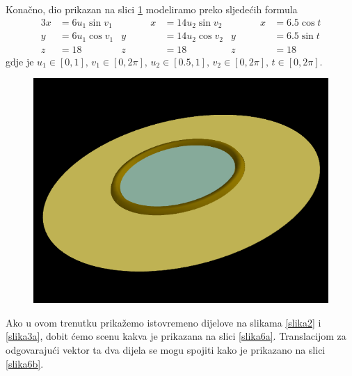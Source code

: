 \documentclass[a4paper,12pt]{article}
\theoremstyle{zad}
\begin{document}
\noindent Kona\v{c}no, dio prikazan na slici \ref{slika5} modeliramo preko sljede\'cih formula
\begin{alignat*}{3}
x&=6u_1\sin{v_1}&\qquad\quad x&=14u_2\sin{v_2}&\qquad\quad x&=6.5\cos{t}\\[3pt]
y&=6u_1\cos{v_1}& y&=14u_2\cos{v_2}& y&=6.5\sin{t}\\[3pt]
z&=18& z&=18& z&=18
\end{alignat*}
gdje je $u_1\in[0,1],\, v_1\in[0,2\pi],\, u_2\in[0.5,1],\, v_2\in[0,2\pi],\, t\in[0,2\pi]$.\par\vspace*{5pt}
\begin{figure}[!h]
\centering
\includegraphics[scale=0.25]{slika5.png}
\vspace*{-10pt}
\caption{}
\label{slika5}
\end{figure}\vspace*{5pt}
\noindent Ako u ovom trenutku prika\v{z}emo istovremeno dijelove na slikama \ref{slika2} i \ref{slika3a}, dobit \'cemo
scenu kakva je prikazana na slici \ref{slika6a}. Translacijom za odgovarajući vektor ta dva dijela se mogu spojiti
kako je prikazano na slici \ref{slika6b}.\par\vspace*{5pt}
\end{document}
